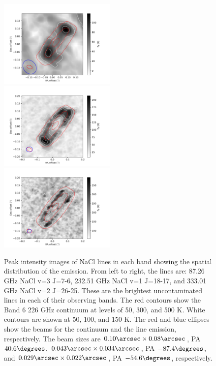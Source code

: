 \documentclass[12pt]{article}
\begin{document}
\begin{figure}[!htp]
\includegraphics[scale=1,width=2.25in]{figures/OrionSourceI_NaClv=3_7-6_robust0.5.maskedclarkclean10000_medsub_K_peak_offset_contours.pdf}
\includegraphics[scale=1,width=2.25in]{figures/OrionSourceI_NaClv=1_18-17_robust0.5.maskedclarkclean10000_medsub_K_peak_offset_contours.pdf}
\includegraphics[scale=1,width=2.25in]{figures/OrionSourceI_NaClv=2_26-25_robust0.5.maskedclarkclean10000_medsub_K_peak_offset_contours.pdf}
\caption{Peak intensity images of NaCl lines in each band showing the spatial
distribution of the emission.  From left to right, the lines are: 87.26 GHz
NaCl v=3 J=7-6, 232.51 GHz NaCl v=1 J=18-17, and 333.01 GHz NaCl v=2 J=26-25.
These are the brightest uncontaminated lines in each of their observing bands.
The red contours show the Band 6 226 GHz continuum at levels of 50, 300, and 500 K.
White contours are shown at 50, 100, and 150 K.
The red and blue ellipses show the beams for the continuum and the line emission,
respectively.  The beam sizes are
$0.10 \arcsec \times 0.08 \arcsec$, PA $40.6 \degrees$,
$0.043 \arcsec \times 0.034 \arcsec$, PA $-87.4 \degrees$, and
$0.029 \arcsec \times 0.022 \arcsec$, PA $-54.6 \degrees$, respectively.
}
\label{fig:spatial}
\end{figure}
\end{document}
